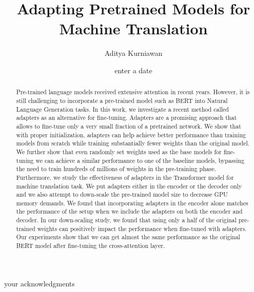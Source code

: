 \documentclass[12pt, a4paper]{report}
\theoremstyle{definition}
\theoremstyle{definition}%
\theoremstyle{definition}%
\theoremstyle{definition}%
\theoremstyle{definition}%
\theoremstyle{definition}%
\begin{document}
\title{Adapting Pretrained Models for Machine Translation}
\author{Aditya Kurniawan}
\date{enter a date}

\frontmatter


\begin{acknowledgements}
    your acknowledgments
\end{acknowledgements}

\begin{abstract}
    Pre-trained language models received extensive attention in recent years. However, it is still challenging to incorporate a pre-trained model such as BERT into Natural Language Generation tasks. In this work, we investigate a recent method called adapters as an alternative for fine-tuning. Adapters are a promising approach that allows to fine-tune only a very small fraction of a pretrained network.
    We show that with proper initialization, adapters can help achieve better performance than training models from scratch while training substantially fewer weights than the original model.
    We further show that even randomly set weights used as the base models for fine-tuning we can achieve a similar performance to one of the baseline models, bypassing the need to train hundreds of millions of weights in the pre-training phase.
    Furthermore, we study the effectiveness of adapters in the Transformer model for machine translation task. We put adapters either in the encoder or the decoder only and we also attempt to down-scale the pre-trained model size to decrease GPU memory demands.
    We found that incorporating adapters in the encoder alone matches the performance of the setup when we include the adapters on both the encoder and decoder.
    In our down-scaling study, we found that using only a half of the original pre-trained weights can positively impact the performance when fine-tuned with adapters. Our experiments show that we can get almost the same performance as the original BERT model after fine-tuning the cross-attention layer.
\end{abstract}

\tableofcontents

\listoffigures

\listoftables



\mainmatter

\end{document}
